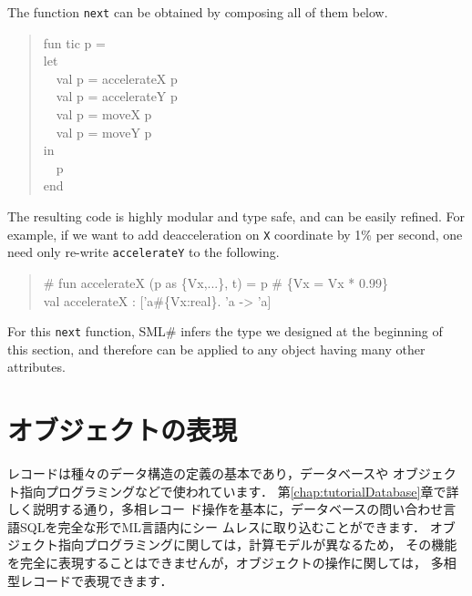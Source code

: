 \documentclass{jbook}
\newif\ifjp
\newcommand{\txt}[2]{#1}
\newcommand{\smlsharp}{SML\#}
\newcommand{\myem}{\mbox{\ \ }}
\begin{document}
	The function {\tt next} can be obtained by composing all of them
below.
\begin{tt}\begin{quote}
fun tic p =\\
let\\
\myem  val p = accelerateX p\\
\myem  val p = accelerateY p\\
\myem  val p = moveX p\\
\myem  val p = moveY p\\
in\\
\myem  p\\
end
\end{quote}\end{tt}
	The resulting code is highly modular and type safe, and can be
easily refined.
	For example, if we want to add deacceleration on {\tt X}
coordinate by 1\% per second, one need only re-write {\tt accelerateY}
to the following.
\begin{tt}\begin{quote}
\# fun accelerateX (p as \{Vx,...\}, t) = p \# \{Vx = Vx * 0.99\}\\
val accelerateX : ['a\#\{Vx:real\}. 'a -> 'a]\\
\end{quote}\end{tt}

	For this {\tt next} function, \smlsharp{} infers the type we 
designed at the beginning of this section, and therefore can be applied
to any object having many other attributes.
\fi%


\section{\txt{オブジェクトの表現}{Representing objects}}
\label{sec:extensionObject}

\ifjp%
	レコードは種々のデータ構造の定義の基本であり，データベースや
オブジェクト指向プログラミングなどで使われています．
	第\ref{chap:tutorialDatabase}章で詳しく説明する通り，多相レコー
ド操作を基本に，データベースの問い合わせ言語SQLを完全な形でML言語内にシー
ムレスに取り込むことができます．
	オブジェクト指向プログラミングに関しては，計算モデルが異なるため，
その機能を完全に表現することはできませんが，オブジェクトの操作に関しては，
多相型レコードで表現できます．
	
\end{document}
